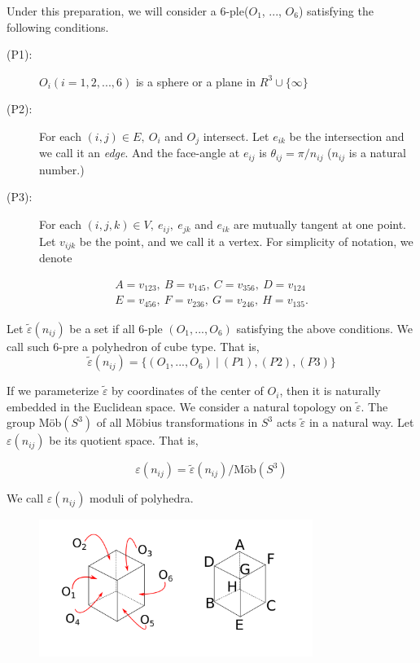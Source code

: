 \documentclass[suppldata, dvipdfmx]{interact}
\theoremstyle{plain}%
\theoremstyle{definition}
\theoremstyle{remark}
\theoremstyle{problemstyle}
\begin{document}
Under this preparation, we will consider a 6-ple($O_1$, ..., $O_6$)
satisfying the following conditions.

\begin{description}
 \item[(P1):] $O_i(i = 1, 2, ..., 6)$ is a sphere or a plane in $R^3
            \cup \{\infty\}$
 \item[(P2):] For each $(i, j) \in E,~O_i$ and $O_j$ intersect. Let
            $e_{ik}$ be the intersection and we call it an
            \textit{edge}. And the face-angle at $e_{ij}$ is
            $\theta_{ij} = \pi/n_{ij}$ ($n_{ij}$ is a natural number.)
 \item[(P3):] For each $(i, j, k) \in V,~e_{ij},~e_{jk}$ and $e_{ik}$
            are mutually tangent at one point. Let $v_{ijk}$ be 
            the point, and we call it a vertex. For simplicity of
            notation, we denote
\end{description}
\begin{eqnarray*}
A = v_{123},~B=v_{145},~C = v_{356},~D = v_{124}\\
E = v_{456},~F=v_{236},~G = v_{246},~H = v_{135}.
\end{eqnarray*}

Let $\tilde\varepsilon(n_{ij})$ be a set if all 6-ple $(O_1, ..., O_6)$
satisfying the above conditions. We call such 6-pre a polyhedron of
cube type. That is,
$$
\tilde\varepsilon(n_{ij}) = \{(O_1, ..., O_6)~|~(P1), (P2), (P3)\}
$$

If we parameterize $\tilde\varepsilon$ by coordinates of the center of
$O_i$, then it is naturally embedded in the Euclidean space. We consider
a natural topology on $\tilde\varepsilon$. The group M\"ob$(S^3)$ of all
M\"obius transformations in $S^3$ acts $\tilde\varepsilon$ in a natural way.
Let $\varepsilon(n_{ij})$ be its quotient space. That is,

$$
\varepsilon (n_{ij}) = \tilde\varepsilon(n_{ij}) / \text{M\"ob}(S^3)
$$

\noindent We call $\varepsilon(n_{ij})$ moduli of polyhedra.

\begin{figure}[h!tbp]
 \centering
 \includegraphics[width=3.5in,
 keepaspectratio]{./img/HexahedraWithSphericalFaces/cubes.png}
 \caption{}
 \label{fig:cubes}
\end{figure}
\end{document}
